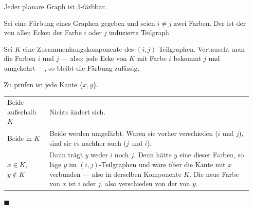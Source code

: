 \begin{merksatz}
Jeder planare Graph ist $5$-färbbar.
\end{merksatz}

\begin{merksatz}
Sei eine Färbung eines Graphen gegeben und seien $i \neq j$ zwei Farben. Der  ist der von allen Ecken der Farbe $i$ oder $j$ induzierte Teilgraph.

Sei $K$ eine Zusammenhangskomponente des $(i,j)$-Teilgraphen. Vertauscht man  die Farben $i$ und $j$ --- also: jede Ecke von $K$ mit Farbe $i$ bekommt $j$ und umgekehrt ---, so bleibt die Färbung zulässig.

Zu prüfen ist jede Kante $\{x,y\}$.
\begin{center}
\renewcommand{\arraystretch}{1.5}
\begin{tabular}{@{}P{2.6cm}P{6.0cm}@{}}
\toprule
Beide außerhalb $K$ & Nichts ändert sich.\\
Beide in $K$ & Beide werden umgefärbt. Waren sie vorher verschieden ($i$ und $j$), sind sie es nachher auch ($j$ und $i$).\\
$x \in K$, $y \notin K$ & Dann trägt $y$ weder $i$ noch $j$. Denn hätte $y$ eine dieser Farben, so läge $y$ im $(i,j)$-Teilgraphen und wäre über die Kante mit $x$ verbunden --- also in derselben Komponente $K$. Die neue Farbe von $x$ ist $i$ oder $j$, also verschieden von der von $y$.\\
\bottomrule
\end{tabular}
\end{center}
$\blacksquare$

\begin{center}
\end{center}
\end{merksatz}

